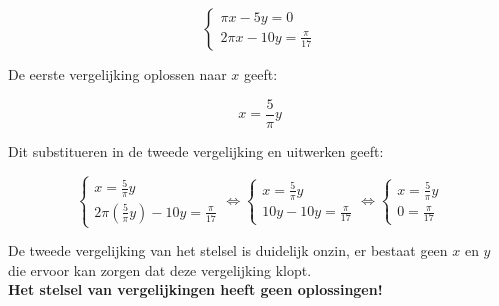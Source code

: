 \begin{voorbeeld}
	
\[\left\{ \begin{array}{l}
\pi x - 5y = 0\\
2 \pi x - 10y = \frac{\pi}{17}
\end{array} \right.\]

De eerste vergelijking oplossen naar $x$ geeft:

\[ x=\frac{5}{\pi}y \]

Dit substitueren in de tweede vergelijking en uitwerken geeft:

\[\left\{ \begin{array}{l}
x=\frac{5}{\pi}y \\
2 \pi (\frac{5}{\pi}y) - 10y = \frac{\pi}{17}
\end{array} \right. \Leftrightarrow \left\{ \begin{array}{l}
x=\frac{5}{\pi}y \\
10y -10y = \frac{\pi}{17}
\end{array} \right. \Leftrightarrow \left\{ \begin{array}{l}
x=\frac{5}{\pi}y \\
0=\frac{\pi}{17}
\end{array} \right.\]

De tweede vergelijking van het stelsel is duidelijk onzin, er bestaat geen $x$ en $y$ die ervoor kan zorgen dat deze vergelijking klopt.\\

{\bf Het stelsel van vergelijkingen heeft geen oplossingen!}

\end{voorbeeld}

